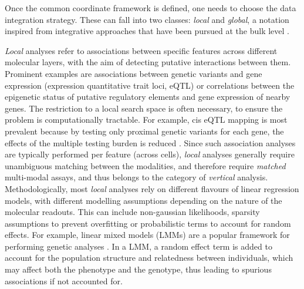 Once the common coordinate framework is defined, one needs to choose the data integration strategy. These can fall into two classes: \textit{local} and \textit{global}, a notation inspired from integrative approaches that have been pursued at the bulk level \cite{Ritchie2015}. 

\textit{Local} analyses refer to associations between specific features across different molecular layers, with the aim of detecting putative interactions between them. Prominent examples are associations between genetic variants and gene expression (expression quantitative trait loci, eQTL) or correlations between the epigenetic status of putative regulatory elements and gene expression of nearby genes. The restriction to a local search space is often necessary, to ensure the problem is computationally tractable. For example, cis eQTL mapping is most prevalent because by testing only proximal genetic variants for each gene, the effects of the multiple testing burden is reduced \cite{Nica2013}. Since such association analyses are typically performed per feature (across cells), \textit{local} analyses generally require unambiguous matching between the modalities, and therefore require \textit{matched} multi-modal assays, and thus belongs to the category of \textit{vertical} analysis. Methodologically, most \textit{local} analyses rely on different flavours of linear regression models, with different modelling assumptions depending on the nature of the molecular readouts. This can include non-gaussian likelihoods, sparsity assumptions to prevent overfitting or probabilistic terms to account for random effects. For example, linear mixed models (LMMs) are a popular framework for performing genetic analyses \cite{Moore2019}. In a LMM, a random effect term is added to account for the population structure and relatedness between individuals, which may affect both the phenotype and the genotype, thus leading to spurious associations if not accounted for.

